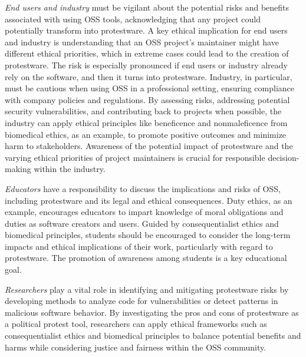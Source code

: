 \documentclass[journal,twocolumn]{IEEEtran}
\begin{document}
\textit{End users and industry} must be vigilant about the potential risks and benefits associated with using OSS tools, acknowledging that any project could potentially transform into protestware. A key ethical implication for end users and industry is understanding that an OSS project's maintainer might have different ethical priorities, which in extreme cases could lead to the creation of protestware. The risk is especially pronounced if end users or industry already rely on the software, and then it turns into protestware. Industry, in particular, must be cautious when using OSS in a professional setting, ensuring compliance with company policies and regulations. By assessing risks, addressing potential security vulnerabilities, and contributing back to projects when possible, the industry can apply ethical principles like beneficence and nonmaleficence from biomedical ethics, as an example, to promote positive outcomes and minimize harm to stakeholders. Awareness of the potential impact of protestware and the varying ethical priorities of project maintainers is crucial for responsible decision-making within the industry.

\textit{Educators} have a responsibility to discuss the implications and risks of OSS, including protestware and its legal and ethical consequences. Duty ethics, as an example, encourages educators to impart knowledge of moral obligations and duties as software creators and users. Guided by consequentialist ethics and biomedical principles, students should be encouraged to consider the long-term impacts and ethical implications of their work, particularly with regard to protestware. The promotion of awareness among students is a key educational goal.

\textit{Researchers} play a vital role in identifying and mitigating protestware risks by developing methods to analyze code for vulnerabilities or detect patterns in malicious software behavior. By investigating the pros and cons of protestware as a political protest tool, researchers can apply ethical frameworks such as consequentialist ethics and biomedical principles to balance potential benefits and harms while considering justice and fairness within the OSS community.


\end{document}
